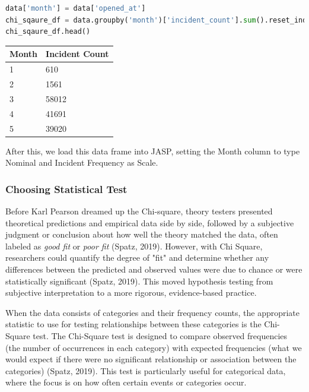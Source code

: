 \documentclass{article}
\begin{document}
\begin{lstlisting}[language=Python]
data['month'] = data['opened_at']
chi_sqaure_df = data.groupby('month')['incident_count'].sum().reset_index()
chi_sqaure_df.head()
\end{lstlisting}

\begin{table}[htbp]
\centering
\begin{flushleft}
\begin{tabular}{|l|l|}
\hline
\textbf{Month} & \textbf{Incident Count} \\
\hline
1 & 610 \\
2 & 1561 \\
3 & 58012 \\
4 & 41691 \\
5 & 39020 \\
\hline
\end{tabular}
\end{flushleft}
\label{tab:incident_count}
\end{table}

After this, we load this data frame into JASP, setting the Month column to type Nominal and Incident Frequency as Scale.

\subsubsection{Choosing Statistical Test}

Before Karl Pearson dreamed up the Chi-square, theory testers presented theoretical predictions and empirical data side by side, followed by a subjective judgment or conclusion about how well the theory matched the data, often labeled as \textit{good fit} or \textit{poor fit} (Spatz, 2019). However, with Chi Square, researchers could quantify the degree of "fit" and determine whether any differences between the predicted and observed values were due to chance or were statistically significant (Spatz, 2019). This moved hypothesis testing from subjective interpretation to a more rigorous, evidence-based practice.


When the data consists of categories and their frequency counts, the appropriate statistic to use for testing relationships between these categories is the Chi-Square test. The Chi-Square test is designed to compare observed frequencies (the number of occurrences in each category) with expected frequencies (what we would expect if there were no significant relationship or association between the categories) (Spatz, 2019). This test is particularly useful for categorical data, where the focus is on how often certain events or categories occur.
\end{document}
